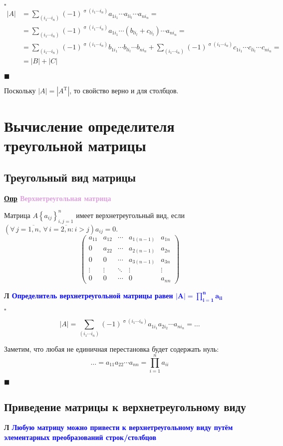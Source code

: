\documentclass[12pt, a4paper]{report}
\newcommand{\sqbox}{%
	\collectbox{%
		\setlength{\fboxsep}{2pt}%
		\fbox{\BOXCONTENT}%
	}%
}
\newcommand{\df}[1][]{\begin{flushleft}\textbf{\underline{Опр} \textcolor{Plum}{#1}}\end{flushleft}}
\newcommand{\lm}[1][]{\begin{flushleft}\textbf{\sqbox{Л} \textcolor{Blue}{#1}}\end{flushleft}}
\newcommand{\inlineperm}[3][i]{{#1}_{#2}\dotsb{#1}_{#3}}
\let\oldforall\forall
\renewcommand{\forall}{\oldforall\,}
\begin{document}
	$\square$
	\begin{align*}
	|A| &= \sum_{(\inlineperm{1}{n})}(-1)^{\upsigma(\inlineperm{1}{n})}a_{1i_1}\cdots a_{li_l}\cdots a_{ni_n}=
	\\[5pt]&=\sum_{(\inlineperm{1}{n})}(-1)^{\upsigma(\inlineperm{1}{n})}a_{1i_1}\cdots (b_{li_l}+c_{li_l})\cdots a_{ni_n}=
	\\[5pt]&=\sum_{(\inlineperm{1}{n})}(-1)^{\upsigma(\inlineperm{1}{n})}b_{1i_1}\cdots b_{li_l}\cdots b_{ni_n} + \sum_{(\inlineperm{1}{n})}(-1)^{\upsigma(\inlineperm{1}{n})}c_{1i_1}\cdots c_{li_l}\cdots c_{ni_n}=
	\\[5pt]&=|B|+|C|
	\end{align*}
	
	$\blacksquare$
	\smallskip
	
	Поскольку $|A|=\left|A^{\mathrm{T}}\right|$, то свойство верно и для столбцов.
	\section{Вычисление определителя треугольной матрицы}
	\subsection{Треугольный вид матрицы}
	\df[Верхнетреугольная матрица]
	
	Матрица $A\left\{a_{ij}\right\}_{i,j=1}^{n}$ имеет верхнетреугольный вид, если $\left(\forall j =\overline{1,n},\, \forall i =\overline{2,n}: i>j\right) a_{ij} = 0$.
	\[
	\begin{pmatrix} 
	a_{11}&a_{12}&\dotsb&a_{1(n-1)}&a_{1n}\\
	0&a_{22}&\cdots&a_{2(n-1)}&a_{2n}\\
	0&0&\cdots&a_{3(n-1)}&a_{3n}\\
	\vdots&\vdots&\ddots&\vdots&\vdots\\
	0&0&\cdots&0&a_{nn}
	\end{pmatrix}
	\]
	\lm[Определитель верхнетреугольной матрицы равен $\displaystyle\boldsymbol{|A|=\prod_{i=1}^{n}a_{ii}}$]
	
	$\square$
	
	\[
	|A| = \sum_{(\inlineperm{1}{n})}(-1)^{\upsigma(\inlineperm{1}{n})}a_{1i_1}a_{2i_2}\cdots a_{ni_n}=\dotso
	\]
	
	Заметим, что любая не единичная перестановка будет содержать нуль:
	\[
	\dotso=a_{11}a_{22}\cdots a_{nn}=\prod_{i=1}^{n}a_{ii}
	\]
	
	$\blacksquare$
	\subsection{Приведение матрицы к верхнетреугольному виду}
	\lm[Любую матрицу можно привести к верхнетреугольному виду путём элементарных преобразований строк/столбцов]
	
\end{document}
